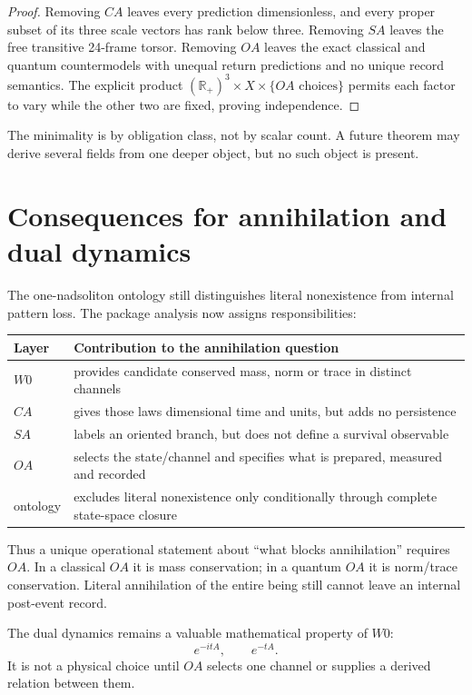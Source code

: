 \documentclass[11pt,a4paper]{article}
\begin{document}
\begin{proof}
Removing $CA$ leaves every prediction dimensionless, and every proper subset
of its three scale vectors has rank below three.  Removing $SA$ leaves the
free transitive 24-frame torsor.  Removing $OA$ leaves the exact classical and
quantum countermodels with unequal return predictions and no unique record
semantics.  The explicit product
$(\mathbb R_+)^3\times X\times\{OA\text{ choices}\}$ permits each factor to
vary while the other two are fixed, proving independence.
\end{proof}

The minimality is by obligation class, not by scalar count.  A future theorem
may derive several fields from one deeper object, but no such object is present.

\section{Consequences for annihilation and dual dynamics}

The one-nadsoliton ontology still distinguishes literal nonexistence from
internal pattern loss.  The package analysis now assigns responsibilities:
\begin{longtable}{@{}p{}p{}@{}}
\toprule
Layer & Contribution to the annihilation question \\
\midrule\endhead
$W0$ & provides candidate conserved mass, norm or trace in distinct channels \\
$CA$ & gives those laws dimensional time and units, but adds no persistence \\
$SA$ & labels an oriented branch, but does not define a survival observable \\
$OA$ & selects the state/channel and specifies what is prepared, measured and recorded \\
ontology & excludes literal nonexistence only conditionally through complete state-space closure \\
\bottomrule
\end{longtable}

Thus a unique operational statement about ``what blocks annihilation'' requires
$OA$.  In a classical $OA$ it is mass conservation; in a quantum $OA$ it is
norm/trace conservation.  Literal annihilation of the entire being still
cannot leave an internal post-event record.

The dual dynamics remains a valuable mathematical property of $W0$:
\[
 e^{-itA},\qquad e^{-tA}.
\]
It is not a physical choice until $OA$ selects one channel or supplies a
derived relation between them.
\end{document}
